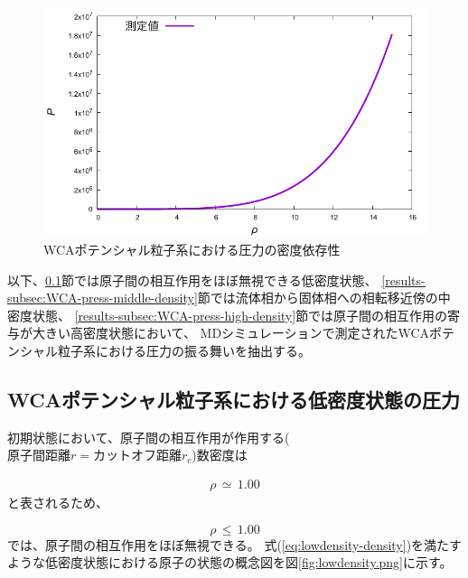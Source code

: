 \documentclass[titlepage]{jsreport}
\begin{document}
{{{\begin{figure}[htbp]
    \begin{center}
        \includegraphics[width=14cm]{fig/den-pre.pdf}
    \end{center}
    \caption{WCAポテンシャル粒子系における圧力の密度依存性}
    \label{fig:den-pre}
\end{figure}

\newpage
以下、\ref{results-subsec:WCA-press-low-density}節では原子間の相互作用をほぼ無視できる低密度状態、
\ref{results-subsec:WCA-press-middle-density}節では流体相から固体相への相転移近傍の中密度状態、
\ref{results-subsec:WCA-press-high-density}節では原子間の相互作用の寄与が大きい高密度状態において、
MDシミュレーションで測定されたWCAポテンシャル粒子系における圧力の振る舞いを抽出する。


\subsection{WCAポテンシャル粒子系における低密度状態の圧力}\label{results-subsec:WCA-press-low-density}
初期状態において、原子間の相互作用が作用する($原子間距離r=カットオフ距離r_c$)数密度は

\large
\begin{eqnarray}
\rho\,{\simeq}\,1.00 \nonumber
\end{eqnarray}
\normalsize
と表されるため、

\large
\begin{equation}
\rho\,{\leq}\,1.00 \label{eq:lowdensity-density}
\end{equation}
\normalsize
では、原子間の相互作用をほぼ無視できる。
式(\ref{eq:lowdensity-density})を満たすような低密度状態における原子の状態の概念図を図\ref{fig:lowdensity.png}に示す。

}}}
\end{document}
